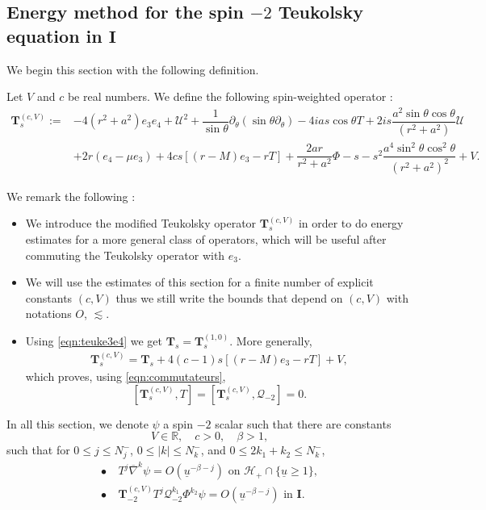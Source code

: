 \documentclass[reqno]{amsart}
\numberwithin{equation}{section}
\newcommand{\mch}{\mathcal{H}}
\newcommand{\mcq}{\mathcal{Q}}
\newcommand{\mcu}{\mathcal{U}}
\newcommand{\ubar}{{\underline{u}}}
\newcommand{\carterm}{\mcq_{-2}}
\newcommand{\nablabar}{\overline{\nabla}}
\newcommand{\teuk}{\mathbf{T}}
\newcommand{\un}{\mathbf{I}}
\theoremstyle{plain}
\theoremstyle{definition}
\theoremstyle{remark}
\numberwithin{equation}{section}
\begin{document}
\subsection{Energy method for the spin $-2$ Teukolsky equation in $\un$}
\label{subsection:energyI}
We begin this section with the following definition.
\begin{defi}
    Let $V$ and $c$ be real numbers. We define the following spin-weighted operator :
    \begin{align}\label{eqn:teukmodifI}
    \teuk_s^{(c,V)}:=&-4(r^2+a^2)e_3e_4+ \mcu^2+\dfrac{1}{\sin\theta}\partial_\theta(\sin\theta\partial_\theta)-4 ias\cos\theta T+2is\dfrac{a^2\sin\theta\cos\theta}{(r^2+a^2)}\mcu\nonumber\\
    &+2 r (e_4-\mu e_3)+4cs[(r-M)e_3- rT]+\dfrac{2ar }{r^2+a^2}\Phi- s-s^2\dfrac{a^4\sin^2\theta\cos^2\theta}{(r^2+a^2)^2}+V.
\end{align}
\end{defi}
\begin{rem}We remark the following :
\begin{itemize}
    \item We introduce the modified Teukolsky operator $\teuk_s^{(c,V)}$ in order to do energy estimates for a more general class of operators, which will be useful after commuting the Teukolsky operator with $e_3$.
    \item We will use the estimates of this section for a finite number of explicit constants $(c,V)$ thus we still write the bounds that depend on $(c,V)$ with notations $O$, $\lesssim$.
    \item Using \eqref{eqn:teuke3e4} we get $\teuk_s=\teuk_s^{(1,0)}$. More generally, 
    \begin{align}\label{eqn:recupc}
        \teuk_s^{(c,V)}=\teuk_s+4(c-1)s[(r-M)e_3-rT]+V,
    \end{align}
    which proves, using \eqref{eqn:commutateurs},
    $$[\teuk_s^{(c,V)},T]=[\teuk_s^{(c,V)},\carterm]=0.$$
\end{itemize}

\end{rem}
In all this section, we denote $\psi$ a spin $-2$ scalar such that there are constants 
$$V\in\mathbb{R},\quad c>0,\quad\beta>1,$$ 
such that for $0\leq j\leq N_j^-$, $0\leq |k|\leq N_k^-$, and $0\leq 2 k_1+k_2\leq N_k^-$,
\begin{align}
    \bullet\:&T^j\nablabar^k\psi=O(\ubar^{-\beta-j})\text{   on   }\mch_+\cap\{\ubar\geq 1\},\label{eqn:hyppsiborne}\\
    \bullet\:&\teuk_{-2}^{(c,V)}T^j\mcq_{-2}^{k_1}\Phi^{k_2}\psi=O(\ubar^{-\beta-j})\text{   in   }\un.\label{eqn:hyppsiteuk}
\end{align}
\end{document}
